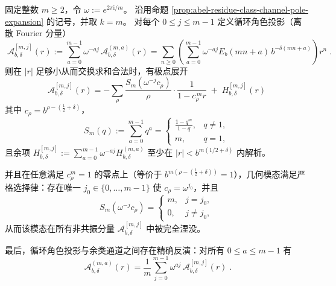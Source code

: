 \begin{proposition}\label{prop:abel-cyclic-character-projection}
固定整数 \(m\ge 2\)，令 \(\omega:=e^{2\pi \mathrm{i}/m}\)。
沿用命题 \ref{prop:abel-residue-class-channel-pole-expansion} 的记号，并取 \(k=m\)。
对每个 \(0\le j\le m-1\) 定义循环角色投影（离散 Fourier 分量）
\begin{equation}\label{eq:abel-cyclic-projection-def}
\boxed{\;
\mathcal A_{b,\delta}^{[m,j]}(r):=\sum_{a=0}^{m-1}\omega^{-aj}\,\mathcal A_{b,\delta}^{(m,a)}(r)
=\sum_{n\ge 0}\left(\sum_{a=0}^{m-1}\omega^{-aj}E_b(mn+a)\,b^{-\delta(mn+a)}\right)r^n\; }.
\end{equation}
则在 \(|r|\) 足够小从而交换求和合法时，有极点展开
\begin{equation}\label{eq:abel-cyclic-projection-pole-expansion}
\boxed{\;
\mathcal A_{b,\delta}^{[m,j]}(r)
=-\sum_{\rho}\frac{S_m(\omega^{-j}c_\rho)}{\rho}\cdot\frac{1}{1-c_\rho^{\,m}r}
\;+\;H_{b,\delta}^{[m,j]}(r)\;}
\end{equation}
其中 \(c_\rho=b^{\rho-(\frac12+\delta)}\)，
\[
S_m(q):=\sum_{a=0}^{m-1}q^a
=\begin{cases}
\frac{1-q^m}{1-q},&q\neq 1,\\
m,&q=1,
\end{cases}
\]
且余项 \(H_{b,\delta}^{[m,j]}:=\sum_{a=0}^{m-1}\omega^{-aj}H_{b,\delta}^{(m,a)}\) 至少在 \(|r|<b^{m(1/2+\delta)}\) 内解析。
\par
并且在任意满足 \(c_\rho^m=1\) 的零点上（等价于 \(b^{m(\rho-(\frac12+\delta))}=1\)），几何模态满足严格选择律：存在唯一 \(j_0\in\{0,\dots,m-1\}\) 使 \(c_\rho=\omega^{j_0}\)，并且
\[
S_m(\omega^{-j}c_\rho)=
\begin{cases}
m,&j=j_0,\\
0,&j\neq j_0,
\end{cases}
\]
从而该模态在所有非共振分量 \(\mathcal A_{b,\delta}^{[m,j]}\) 中被完全湮没。
\par
最后，循环角色投影与余类通道之间存在精确反演：对所有 \(0\le a\le m-1\) 有
\begin{equation}\label{eq:abel-cyclic-projection-inversion}
\boxed{\;
\mathcal A_{b,\delta}^{(m,a)}(r)=\frac{1}{m}\sum_{j=0}^{m-1}\omega^{aj}\,\mathcal A_{b,\delta}^{[m,j]}(r)\; }.
\end{equation}
\end{proposition}
